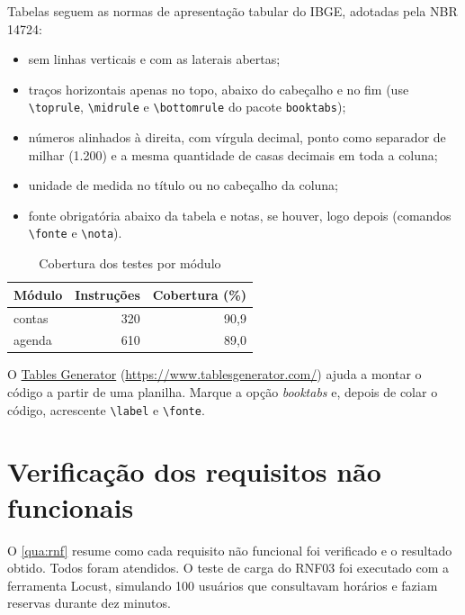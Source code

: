 \begin{instrucao}
Tabelas seguem as normas de apresentação tabular do IBGE, adotadas pela NBR
14724:
\begin{itemize}
  \item sem linhas verticais e com as laterais abertas;
  \item traços horizontais apenas no topo, abaixo do cabeçalho e no fim (use
        \verb|\toprule|, \verb|\midrule| e \verb|\bottomrule| do pacote
        \verb|booktabs|);
  \item números alinhados à direita, com vírgula decimal, ponto como separador
        de milhar (1.200) e a mesma quantidade de casas decimais em toda a
        coluna;
  \item unidade de medida no título ou no cabeçalho da coluna;
  \item fonte obrigatória abaixo da tabela e notas, se houver, logo depois
        (comandos \verb|\fonte| e \verb|\nota|).
\end{itemize}
\begin{exemplocodigo}
\begin{table}[htbp]
  \centering
  \caption{Cobertura dos testes por módulo}
  \label{tab:cobertura}
  \small
  \begin{tabular}{@{}lrr@{}}
    \toprule
    Módulo & Instruções & Cobertura (\%) \\
    \midrule
    contas &   320 & 90,9 \\
    agenda &   610 & 89,0 \\
    \bottomrule
  \end{tabular}
  \fonteautor
\end{table}
\end{exemplocodigo}
O \href{https://www.tablesgenerator.com/}{Tables Generator}
(\url{https://www.tablesgenerator.com/}) ajuda a montar o código a partir de
uma planilha. Marque a opção \emph{booktabs} e, depois de colar o código,
acrescente \verb|\label| e \verb|\fonte|.
\end{instrucao}

\section{Verificação dos requisitos não funcionais}
\label{sec:testes:rnf}

O \cref{qua:rnf} resume como cada requisito não funcional foi verificado e o
resultado obtido. Todos foram atendidos. O teste de carga do RNF03 foi
executado com a ferramenta Locust, simulando 100 usuários que consultavam
horários e faziam reservas durante dez minutos.


